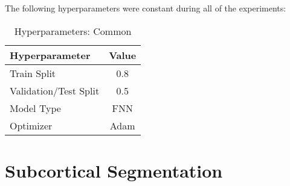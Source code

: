 \label{experiments}

The following hyperparameters were constant during all of the experiments:
\begin{table}[H]
\centering
\begin{tabular}{|l|c|}
\hline
\textbf{Hyperparameter} & \textbf{Value} \\ \hline
Train Split & 0.8 \\ \hline
Validation/Test Split & 0.5 \\ \hline
Model Type & \ac{FNN} \\ \hline
Optimizer & Adam \\ \hline
\end{tabular}
\caption{Hyperparameters: Common}
\end{table}

\section{Subcortical Segmentation}

